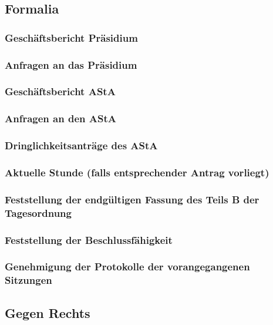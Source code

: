 \documentclass[ngerman,headheight=70pt]{scrartcl}
\begin{document}
    \subsection{Formalia}

    \subsubsection{Geschäftsbericht Präsidium}

    \subsubsection{Anfragen an das Präsidium}

    \subsubsection{Geschäftsbericht AStA}

    \subsubsection{Anfragen an den AStA}

    \subsubsection{Dringlichkeitsanträge des AStA}

    \subsubsection{Aktuelle Stunde (falls entsprechender Antrag vorliegt)}

    \subsubsection{Feststellung der endgültigen Fassung des Teils B der Tagesordnung}

    \subsubsection{Feststellung der Beschlussfähigkeit}

    \subsubsection{Genehmigung der Protokolle der vorangegangenen Sitzungen}

    \subsection{Gegen Rechts}
\end{document}
